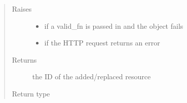 \documentclass[letterpaper,10pt,english]{sphinxmanual}
\begin{document}
\begin{fulllineitems}
\begin{fulllineitems}
\begin{quote}
\begin{description}
\item[{Raises}] \leavevmode\begin{itemize}
\item {} 
\sphinxAtStartPar
{\hyperref[\detokenize{autoapi/pine/client/exceptions/index:pine.client.exceptions.PineClientValueException}]{}} \textendash{} if a valid\_fn is passed in and the object fails

\item {} 
\sphinxAtStartPar
{\hyperref[\detokenize{autoapi/pine/client/exceptions/index:pine.client.exceptions.PineClientHttpException}]{}} \textendash{} if the HTTP request returns an error

\end{itemize}

\item[{Returns}] \leavevmode
\sphinxAtStartPar
the ID of the added/replaced resource

\item[{Return type}] \leavevmode
\sphinxAtStartPar
{}

\end{description}\end{quote}

\end{fulllineitems}



\end{fulllineitems}
\end{document}
